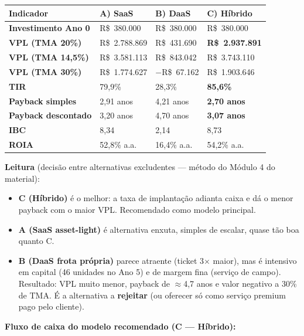 \documentclass[12pt,a4paper]{article}
\newcommand{\rs}{R\$}
\begin{document}
\begin{table}[h]\small\centering
\begin{tabularx}{\textwidth}{>{\bfseries}l Y Y Y}
\toprule
{} Indicador & A) SaaS & B) DaaS & C) Híbrido \\
\midrule
Investimento Ano 0 & \rs~380.000 & \rs~380.000 & \rs~380.000 \\
VPL (TMA 20\%) & \rs~2.788.869 & \rs~431.690 & \textbf{\rs~2.937.891} \\
VPL (TMA 14,5\%) & \rs~3.581.113 & \rs~843.042 & \rs~3.743.110 \\
VPL (TMA 30\%) & \rs~1.774.627 & $-$\rs~67.162 & \rs~1.903.646 \\
TIR & 79,9\% & 28,3\% & \textbf{85,6\%} \\
Payback simples & 2,91 anos & 4,21 anos & \textbf{2,70 anos} \\
Payback descontado & 3,20 anos & 4,70 anos & \textbf{3,07 anos} \\
IBC & 8,34 & 2,14 & 8,73 \\
ROIA & 52,8\% a.a. & 16,4\% a.a. & 54,2\% a.a. \\
\bottomrule
\end{tabularx}
\end{table}

\textbf{Leitura} (decisão entre alternativas excludentes --- método do Módulo 4 do material):
\begin{itemize}
\item \textbf{C (Híbrido)} é o melhor: a taxa de implantação adianta caixa e dá o menor payback com o maior VPL. Recomendado como modelo principal.
\item \textbf{A (SaaS asset-light)} é alternativa enxuta, simples de escalar, quase tão boa quanto C.
\item \textbf{B (DaaS frota própria)} parece atraente (ticket 3$\times$ maior), mas é intensivo em capital (46 unidades no Ano 5) e de margem fina (serviço de campo). Resultado: VPL muito menor, payback de $\approx$4,7 anos e valor negativo a 30\% de TMA. É a alternativa a \textbf{rejeitar} (ou oferecer só como serviço premium pago pelo cliente).
\end{itemize}

\textbf{Fluxo de caixa do modelo recomendado (C --- Híbrido):}
\end{document}
